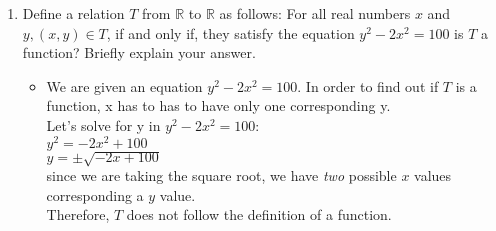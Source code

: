 \documentclass[english,12pt,legalpaper]{article}
\begin{document}
\begin{enumerate}
	
	\item Define a relation $T$ from $\mathbb{R}$ to $\mathbb{R}$ as follows: For all real numbers $x$ and $y, (x,y) \in T$, if and only if, they satisfy the equation $y^2 - 2x^2 =100$ is $T$ a function? Briefly explain your answer.
	\begin{itemize}
	\item We are given an equation $y^2 - 2x^2 =100$. In order to find out if $T$ is a function, x has to has to have only one corresponding y.
	\\ Let's solve for y in $y^2 - 2x^2 =100$: \\ 
	 $y^2 = -2x^2 + 100$ \\ 
	 $y = \pm \sqrt{-2x+100}$ \\ 
	 since we are taking the square root, we have \textit{two} possible $ x$ values corresponding a $y$ value.
	 \\ Therefore, $T$ does not follow the definition of  a function.
	\end{itemize}
\end{enumerate}
\end{document}
